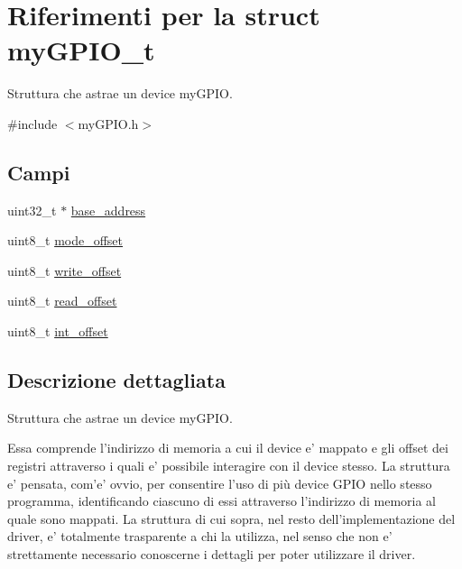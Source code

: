 \hypertarget{structmy_g_p_i_o__t}{\section{Riferimenti per la struct my\+G\+P\+I\+O\+\_\+t}
\label{structmy_g_p_i_o__t}
}


Struttura che astrae un device my\+G\+P\+I\+O.  




{\ttfamily \#include $<$my\+G\+P\+I\+O.\+h$>$}

\subsection*{Campi}
\begin{DoxyCompactItemize}
\item 
uint32\+\_\+t $\ast$ \hyperlink{structmy_g_p_i_o__t_a79c591d5fa42efdf86abd98347fece90}{base\+\_\+address}
\item 
uint8\+\_\+t \hyperlink{structmy_g_p_i_o__t_ad21272e5293d7c1e7ccafe35a2e129d1}{mode\+\_\+offset}
\item 
uint8\+\_\+t \hyperlink{structmy_g_p_i_o__t_abb65e5db6d4ad365a7c48d00e4af1f78}{write\+\_\+offset}
\item 
uint8\+\_\+t \hyperlink{structmy_g_p_i_o__t_ab65acde67dc46f1d163e2ee468420b48}{read\+\_\+offset}
\item 
uint8\+\_\+t \hyperlink{structmy_g_p_i_o__t_a85774c49d56d05c7daa0803bf49654c4}{int\+\_\+offset}
\end{DoxyCompactItemize}


\subsection{Descrizione dettagliata}
Struttura che astrae un device my\+G\+P\+I\+O. 

Essa comprende l'indirizzo di memoria a cui il device e' mappato e gli offset dei registri attraverso i quali e' possibile interagire con il device stesso. La struttura e' pensata, com'e' ovvio, per consentire l'uso di più device G\+P\+I\+O nello stesso programma, identificando ciascuno di essi attraverso l'indirizzo di memoria al quale sono mappati. La struttura di cui sopra, nel resto dell'implementazione del driver, e' totalmente trasparente a chi la utilizza, nel senso che non e' strettamente necessario conoscerne i dettagli per poter utilizzare il driver. 

